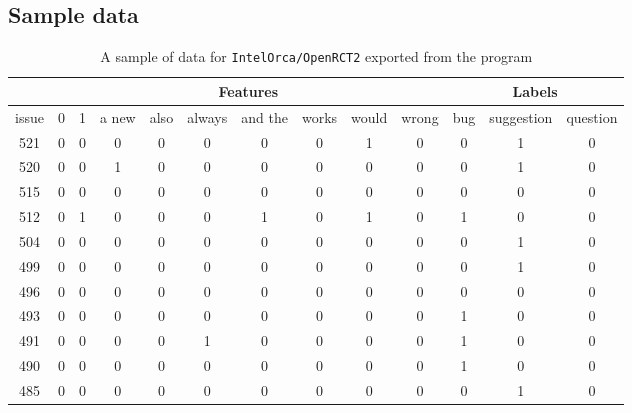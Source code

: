 \documentclass{article}
\begin{document}
\begin{appendices}

\section{Sample data}
\begin{table}[h]
\centering
\begin{tabular}{c|c|c|c|c|c|c||c|c|c|c|c|c}
\hline
 & \multicolumn{9}{|c|}{Features} & \multicolumn{3}{|c}{Labels} \\
\hline
issue & 0 & 1 & a new & also & always & and the  &  works & would & wrong & bug & suggestion & question \\
\hline
\hline
521 & 0 & 0 & 0 & 0 & 0 & 0  &  0 & 1 & 0 & 0 & 1 & 0 \\
520 & 0 & 0 & 1 & 0 & 0 & 0  &  0 & 0 & 0 & 0 & 1 & 0 \\
515 & 0 & 0 & 0 & 0 & 0 & 0  &  0 & 0 & 0 & 0 & 0 & 0 \\
512 & 0 & 1 & 0 & 0 & 0 & 1  &  0 & 1 & 0 & 1 & 0 & 0 \\
504 & 0 & 0 & 0 & 0 & 0 & 0  &  0 & 0 & 0 & 0 & 1 & 0 \\
499 & 0 & 0 & 0 & 0 & 0 & 0  &  0 & 0 & 0 & 0 & 1 & 0 \\
496 & 0 & 0 & 0 & 0 & 0 & 0  &  0 & 0 & 0 & 0 & 0 & 0 \\
493 & 0 & 0 & 0 & 0 & 0 & 0  &  0 & 0 & 0 & 1 & 0 & 0 \\
491 & 0 & 0 & 0 & 0 & 1 & 0  &  0 & 0 & 0 & 1 & 0 & 0 \\
490 & 0 & 0 & 0 & 0 & 0 & 0  &  0 & 0 & 0 & 1 & 0 & 0 \\
485 & 0 & 0 & 0 & 0 & 0 & 0  &  0 & 0 & 0 & 0 & 1 & 0 \\
\hline
\end{tabular}
\caption{A sample of data for \texttt{IntelOrca/OpenRCT2} exported from the program}
\label{tab:sample_data}
\end{table}


\end{appendices}
\end{document}
